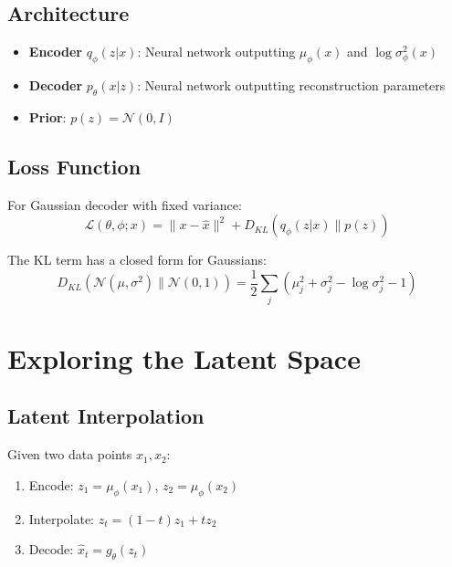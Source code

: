 \subsection{Architecture}

\begin{itemize}
    \item \textbf{Encoder} $q_\phi(z|x)$: Neural network outputting $\mu_\phi(x)$ and $\log \sigma^2_\phi(x)$
    \item \textbf{Decoder} $p_\theta(x|z)$: Neural network outputting reconstruction parameters
    \item \textbf{Prior}: $p(z) = \mathcal{N}(0, I)$
\end{itemize}

\subsection{Loss Function}

For Gaussian decoder with fixed variance:
\begin{equation}
    \mathcal{L}(\theta, \phi; x) = \|x - \hat{x}\|^2 + D_{KL}(q_\phi(z|x) \| p(z))
\end{equation}

The KL term has a closed form for Gaussians:
\begin{equation}
    D_{KL}(\mathcal{N}(\mu, \sigma^2) \| \mathcal{N}(0, 1)) = \frac{1}{2} \sum_j \left( \mu_j^2 + \sigma_j^2 - \log \sigma_j^2 - 1 \right)
\end{equation}



\section{Exploring the Latent Space}

\subsection{Latent Interpolation}

Given two data points $x_1, x_2$:
\begin{enumerate}
    \item Encode: $z_1 = \mu_\phi(x_1)$, $z_2 = \mu_\phi(x_2)$
    \item Interpolate: $z_t = (1-t) z_1 + t z_2$
    \item Decode: $\hat{x}_t = g_\theta(z_t)$
\end{enumerate}


